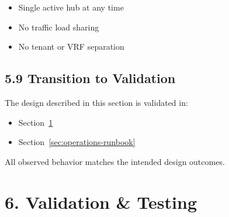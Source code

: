 \documentclass[11pt]{article}
\begin{document}
\begin{itemize}
  \item Single active hub at any time
  \item No traffic load sharing
  \item No tenant or VRF separation
\end{itemize}

\subsection{5.9 Transition to Validation}
\label{sec:transition-validation}

The design described in this section is validated in:

\begin{itemize}
  \item Section~\ref{sec:validation-testing}
  \item Section~\ref{sec:operations-runbook}
\end{itemize}

All observed behavior matches the intended design outcomes.

%
%
%
%
\section{6. Validation \& Testing}
\label{sec:validation-testing}

%
%
%
\end{document}
